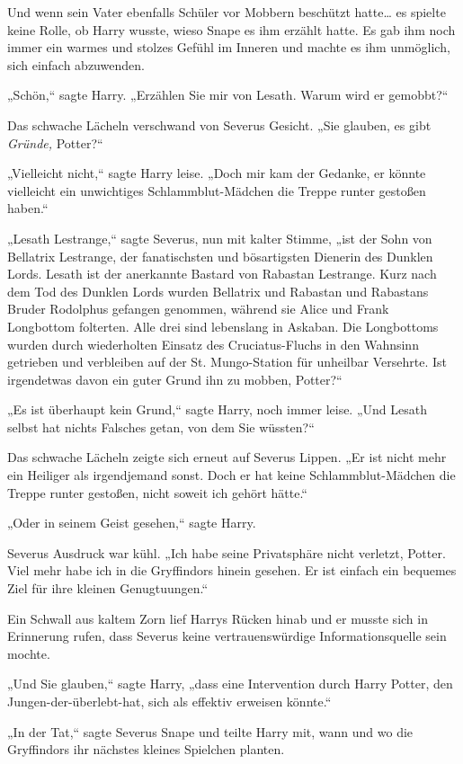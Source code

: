 {Und wenn sein Vater ebenfalls Schüler vor Mobbern beschützt hatte… es spielte keine Rolle, ob Harry wusste, wieso Snape es ihm erzählt hatte. Es gab ihm noch immer ein warmes und stolzes Gefühl im Inneren und machte es ihm unmöglich, sich einfach abzuwenden.

„Schön,“ sagte Harry. „Erzählen Sie mir von Lesath. Warum wird er gemobbt?“

Das schwache Lächeln verschwand von Severus Gesicht. „Sie glauben, es gibt \emph{Gründe,} Potter?“

„Vielleicht nicht,“ sagte Harry leise. „Doch mir kam der Gedanke, er könnte vielleicht ein unwichtiges Schlammblut-Mädchen die Treppe runter gestoßen haben.“

„Lesath Lestrange,“ sagte Severus, nun mit kalter Stimme, „ist der Sohn von Bellatrix Lestrange, der fanatischsten und bösartigsten Dienerin des Dunklen Lords. Lesath ist der anerkannte Bastard von Rabastan Lestrange. Kurz nach dem Tod des Dunklen Lords wurden Bellatrix und Rabastan und Rabastans Bruder Rodolphus gefangen genommen, während sie Alice und Frank Longbottom folterten. Alle drei sind lebenslang in Askaban. Die Longbottoms wurden durch wiederholten Einsatz des Cruciatus-Fluchs in den Wahnsinn getrieben und verbleiben auf der St. Mungo-Station für unheilbar Versehrte. Ist irgendetwas davon ein guter Grund ihn zu mobben, Potter?“

„Es ist überhaupt kein Grund,“ sagte Harry, noch immer leise. „Und Lesath selbst hat nichts Falsches getan, von dem Sie wüssten?“

Das schwache Lächeln zeigte sich erneut auf Severus Lippen. „Er ist nicht mehr ein Heiliger als irgendjemand sonst. Doch er hat keine Schlammblut-Mädchen die Treppe runter gestoßen, nicht soweit ich gehört hätte.“

„Oder in seinem Geist gesehen,“ sagte Harry.

Severus Ausdruck war kühl. „Ich habe seine Privatsphäre nicht verletzt, Potter. Viel mehr habe ich in die Gryffindors hinein gesehen. Er ist einfach ein bequemes Ziel für ihre kleinen Genugtuungen.“

Ein Schwall aus kaltem Zorn lief Harrys Rücken hinab und er musste sich in Erinnerung rufen, dass Severus keine vertrauenswürdige Informationsquelle sein mochte.

„Und Sie glauben,“ sagte Harry, „dass eine Intervention durch Harry Potter, den Jungen-der-überlebt-hat, sich als effektiv erweisen könnte.“

„In der Tat,“ sagte Severus Snape und teilte Harry mit, wann und wo die Gryffindors ihr nächstes kleines Spielchen planten.

}
